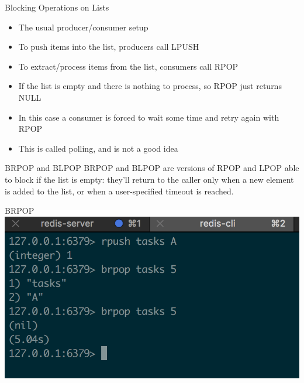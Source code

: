 \documentclass[10pt]{beamer}
\begin{document}
\begin{frame}[fragile]{Blocking Operations on Lists}
  \begin{itemize}
    \item The usual producer/consumer setup
    \item To push items into the list, producers call LPUSH
    \item To extract/process items from the list, consumers call RPOP
    \item If the list is empty and there is nothing to process, so RPOP just
    returns NULL
    \item In this case a consumer is forced to wait some time and retry again
    with RPOP
    \item This is called polling, and is not a good idea
  \end{itemize}
\end{frame}

\begin{frame}[fragile]{BRPOP and BLPOP}
  BRPOP and BLPOP are versions of RPOP and LPOP able to block if the list is
  empty: they'll return to the caller only when a new element is added to the
  list, or when a user-specified timeout is reached.
\end{frame}

\begin{frame}[fragile]{BRPOP}
  \includegraphics[scale=0.9]{img/brpop}
\end{frame}
\end{document}
